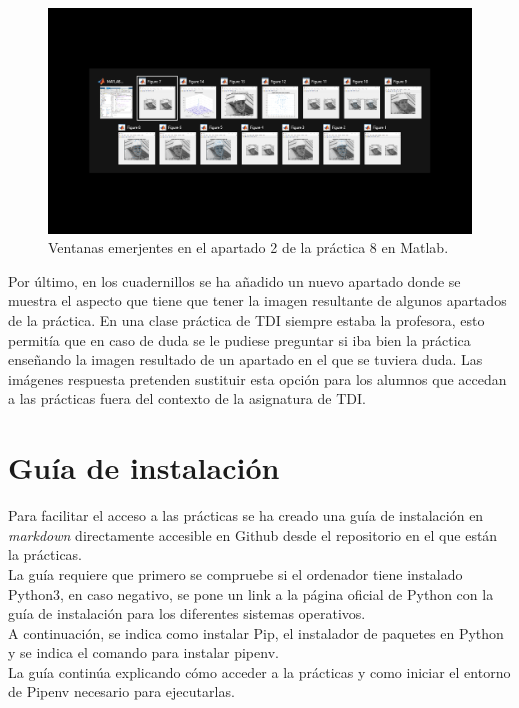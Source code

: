 \documentclass[a4paper,12pt]{report}
\begin{document}
\begin{figure}[h]
\centering
\includegraphics[width=1\textwidth]{imagenes/ventanas}
\caption{Ventanas emerjentes en el apartado 2 de la práctica 8 en Matlab.}
\label{ventanas}
\end{figure}

Por último, en los cuadernillos se ha añadido un nuevo apartado donde se muestra el aspecto que tiene que tener la imagen resultante de algunos apartados de la práctica. En una clase práctica de TDI siempre estaba la profesora, esto permitía que en caso de duda se le pudiese preguntar si iba bien la práctica enseñando la imagen resultado de un apartado en el que se tuviera duda. Las imágenes respuesta pretenden sustituir esta opción para los alumnos que accedan a las prácticas fuera del contexto de la asignatura de TDI.


\section{Guía de instalación}

Para facilitar el acceso a las prácticas se ha creado una guía de instalación en \emph{markdown} directamente accesible en Github desde el repositorio en el que están la prácticas.\\

La guía requiere que primero se compruebe si el ordenador tiene instalado Python3, en caso negativo, se pone un link a la página oficial de Python con la guía de instalación para los diferentes sistemas operativos.\\

A continuación, se indica como instalar Pip, el instalador de paquetes en Python y se indica el comando para instalar pipenv.\\

La guía continúa explicando cómo acceder a la prácticas y como iniciar el entorno de Pipenv necesario para ejecutarlas.\\
\end{document}
